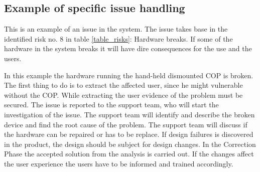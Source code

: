 \subsection{Example of specific issue handling}
This is an example of an issue in the system. The issue takes base in the identified risk no. 8 in table \ref{table_risks}: Hardware breaks. If some of the hardware in the system breaks it will have dire consequences for the use and the users.

In this example the hardware running the hand-held dismounted COP is broken. The first thing to do is to extract the affected user, since he might vulnerable without the COP. While extracting the user evidence of the problem must be secured. The issue is reported to the support team, who will start the investigation of the issue.
The support team will identify and describe the broken device and find the root cause of the problem. The support team will discuss if the hardware can be repaired or has to be replace. If design failures is discovered in the product, the design should be subject for design changes. In the Correction Phase the accepted solution from the analysis is carried out. If the changes affect the user experience the users have to be informed and trained accordingly.